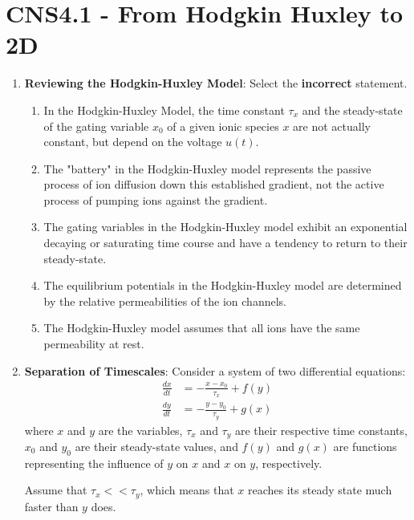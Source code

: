 \documentclass[11pt,letterpaper]{article}
\begin{document}
\maketitle
\thispagestyle{first}

\section{CNS4.1 - From Hodgkin Huxley to 2D}
\begin{enumerate}
    \item \textbf{Reviewing the Hodgkin-Huxley Model}: Select the \textbf{incorrect} statement.
    \begin{enumerate}
        \item In the Hodgkin-Huxley Model, the time constant $\tau_x$ and the steady-state of the gating variable $x_0$ of a given ionic species $x$ are not actually constant, but depend on the voltage $u(t)$.
        \item The "battery" in the Hodgkin-Huxley model represents the passive process of ion diffusion down this established gradient, not the active process of pumping ions against the gradient.
        \item The gating variables in the Hodgkin-Huxley model exhibit an exponential decaying or saturating time course and have a tendency to return to their steady-state.
        \item The equilibrium potentials in the Hodgkin-Huxley model are determined by the relative permeabilities of the ion channels.
        \item The Hodgkin-Huxley model assumes that all ions have the same permeability at rest.
    \end{enumerate}

    \item \textbf{Separation of Timescales}: Consider a system of two differential equations: 
    \begin{align*}
        \frac{dx}{dt} & = -\frac{x - x_{0}}{\tau_x} + f(y) \\
        \frac{dy}{dt} & = -\frac{y - y_0}{\tau_y} + g(x)
    \end{align*}
    where $x$ and $y$ are the variables, $\tau_x$ and $\tau_y$ are their respective time constants, $x_0$ and $y_0$ are their steady-state values, and $f(y)$ and $g(x)$ are functions representing the influence of $y$ on $x$ and $x$ on $y$, respectively. 
    
    Assume that $\tau_x << \tau_y$, which means that $x$ reaches its steady state much faster than $y$ does. 
    

\end{enumerate}
\end{document}
